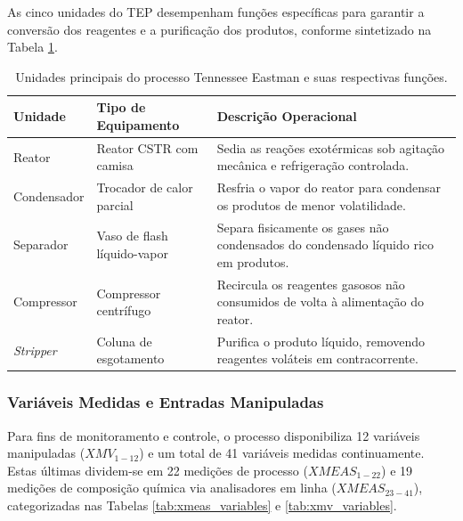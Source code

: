 \documentclass[journal]{IEEEtran}
\begin{document}
As cinco unidades do TEP desempenham funções específicas para garantir a conversão dos reagentes e a purificação dos produtos, conforme sintetizado na Tabela \ref{tab:tep_units}.

\begin{table}[!ht]
\centering
\caption{Unidades principais do processo Tennessee Eastman e suas respectivas funções.}
\label{tab:tep_units}
\small
\begin{tabular}{llp{7.5cm}}
\toprule
\rowcolor{gray!20}
\textbf{Unidade} & \textbf{Tipo de Equipamento} & \textbf{Descrição Operacional} \\
\midrule
Reator & Reator CSTR com camisa & Sedia as reações exotérmicas sob agitação mecânica e refrigeração controlada. \\
Condensador & Trocador de calor parcial & Resfria o vapor do reator para condensar os produtos de menor volatilidade. \\
Separador & Vaso de flash líquido-vapor & Separa fisicamente os gases não condensados do condensado líquido rico em produtos. \\
Compressor & Compressor centrífugo & Recircula os reagentes gasosos não consumidos de volta à alimentação do reator. \\
\textit{Stripper} & Coluna de esgotamento & Purifica o produto líquido, removendo reagentes voláteis em contracorrente. \\
\bottomrule
\end{tabular}
\end{table}

\subsubsection{Variáveis Medidas e Entradas Manipuladas}

Para fins de monitoramento e controle, o processo disponibiliza 12 variáveis manipuladas ($XMV_{1-12}$) e um total de 41 variáveis medidas continuamente. Estas últimas dividem-se em 22 medições de processo ($XMEAS_{1-22}$) e 19 medições de composição química via analisadores em linha ($XMEAS_{23-41}$), categorizadas nas Tabelas \ref{tab:xmeas_variables} e \ref{tab:xmv_variables}.
\end{document}
